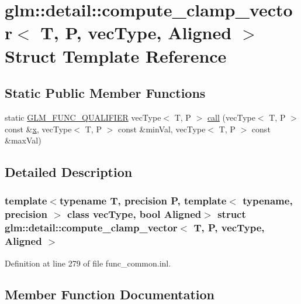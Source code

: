 \hypertarget{structglm_1_1detail_1_1compute__clamp__vector}{}\section{glm\+::detail\+::compute\+\_\+clamp\+\_\+vector$<$ T, P, vec\+Type, Aligned $>$ Struct Template Reference}
\label{structglm_1_1detail_1_1compute__clamp__vector}
\subsection*{Static Public Member Functions}
\begin{DoxyCompactItemize}
\item 
static \mbox{\hyperlink{setup_8hpp_a33fdea6f91c5f834105f7415e2a64407}{G\+L\+M\+\_\+\+F\+U\+N\+C\+\_\+\+Q\+U\+A\+L\+I\+F\+I\+ER}} vec\+Type$<$ T, P $>$ \mbox{\hyperlink{structglm_1_1detail_1_1compute__clamp__vector_ab2a4cd94a8457eec40e9cca5a576fe22}{call}} (vec\+Type$<$ T, P $>$ const \&\mbox{\hyperlink{glad_8h_a92d0386e5c19fb81ea88c9f99644ab1d}{x}}, vec\+Type$<$ T, P $>$ const \&min\+Val, vec\+Type$<$ T, P $>$ const \&max\+Val)
\end{DoxyCompactItemize}


\subsection{Detailed Description}
\subsubsection*{template$<$typename T, precision P, template$<$ typename, precision $>$ class vec\+Type, bool Aligned$>$\newline
struct glm\+::detail\+::compute\+\_\+clamp\+\_\+vector$<$ T, P, vec\+Type, Aligned $>$}



Definition at line 279 of file func\+\_\+common.\+inl.



\subsection{Member Function Documentation}
\mbox{\label{structglm_1_1detail_1_1compute__clamp__vector_ab2a4cd94a8457eec40e9cca5a576fe22}} 
